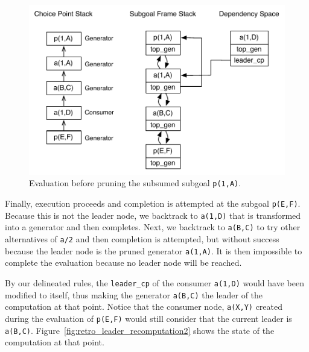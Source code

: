 \begin{figure}[ht]
  \centering
    \includegraphics[scale=0.6]{retro_leader_recomputation.pdf}
  \caption{Evaluation before pruning the subsumed subgoal \texttt{p(1,A)}.}
  \label{fig:retro_leader_recomputation}
\end{figure}

Finally, execution proceeds and completion is attempted at the subgoal \texttt{p(E,F)}.
Because this is not the leader node, we backtrack to \texttt{a(1,D)} that is transformed
into a generator and then completes. Next, we backtrack to \texttt{a(B,C)} to try other
alternatives of \texttt{a/2} and then completion is attempted, but without success because
the leader node is the pruned generator \texttt{a(1,A)}. It is then impossible to complete
the evaluation because no leader node will be reached.

By our delineated rules, the \texttt{leader\_cp} of the consumer \texttt{a(1,D)} would have been
modified to itself, thus making the generator \texttt{a(B,C)} the leader of the computation at that point.
Notice that the consumer node, \texttt{a(X,Y)} created during the evaluation of \texttt{p(E,F)} would still
consider that the current leader is \texttt{a(B,C)}. Figure~\ref{fig:retro_leader_recomputation2} shows the
state of the computation at that point.

